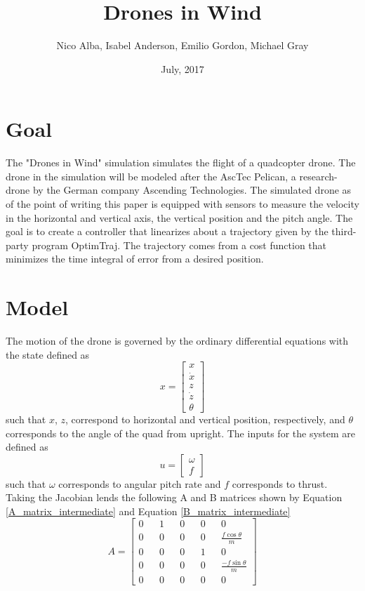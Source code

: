 \documentclass[12pt]{article}
\title{Drones in Wind}
\author{Nico Alba, Isabel Anderson, Emilio Gordon, Michael Gray}
\date{July, 2017}
\begin{document}
\maketitle


\section{Goal}
The "Drones in Wind" simulation simulates the flight of a quadcopter drone. The drone in the simulation will be modeled after the AscTec Pelican, a research-drone by the German company Ascending Technologies. The simulated drone as of the point of writing this paper is equipped with sensors to measure the velocity in the horizontal and vertical axis, the vertical position and the pitch angle. The goal is to create a controller that linearizes about a trajectory given by the third-party program OptimTraj. The trajectory comes from a cost function that minimizes the time integral of error from a desired position.
\section{Model}
The motion of the drone is governed by the ordinary differential equations with the state defined as
\begin{equation}
\label{state}
x = \begin{bmatrix} x\\ \dot{x} \\ z \\ \dot{z} \\ \theta \end{bmatrix}
\end{equation}
such that $x$, $z$, correspond to horizontal and vertical position, respectively, and $\theta$ corresponds to the angle of the quad from upright. The inputs for the system are defined as
\begin{equation}
\label{inputs}
u = \begin{bmatrix} \omega \\ f \end{bmatrix}
\end{equation}
such that $\omega$ corresponds to angular pitch rate and $f$ corresponds to thrust. Taking the Jacobian lends the following A and B matrices shown by Equation \ref{A_matrix_intermediate} and Equation \ref{B_matrix_intermediate}
\begin{equation}
\label{A_matrix_intermediate}
A = \begin{bmatrix} 0 && 1 && 0 && 0 && 0 \\ 0 && 0 && 0 && 0 && \frac{f\cos{\theta}}{m} \\  0 && 0 && 0 && 1 && 0 \\ 0 && 0 && 0 && 0 && \frac{-f\sin{\theta}}{m} \\ 0 && 0 && 0 && 0 && 0 \end{bmatrix}
\end{equation}
\end{document}
